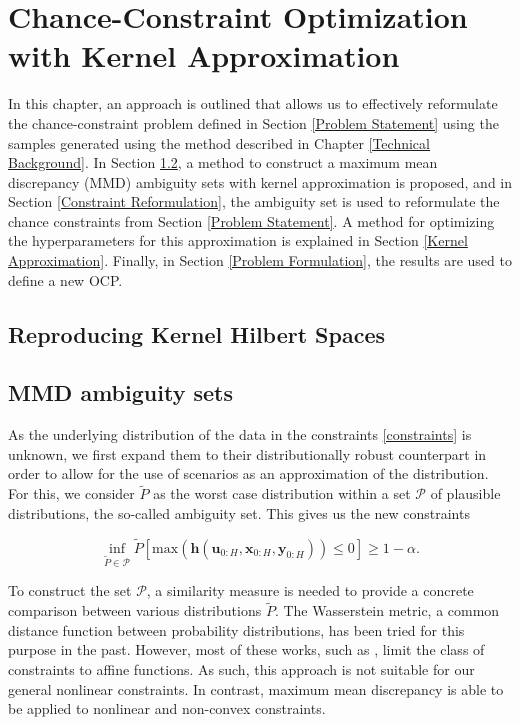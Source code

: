 \chapter{Chance-Constraint Optimization with Kernel Approximation} \label{Technical Approach}

In this chapter, an approach is outlined that allows us to effectively reformulate the chance-constraint problem defined in Section \ref{Problem Statement} using the samples generated using the method described in Chapter \ref{Technical Background}. In Section \ref{SubSec:MMD}, a method to construct a maximum mean discrepancy (MMD) ambiguity sets with kernel approximation is proposed, and in Section \ref{Constraint Reformulation}, the ambiguity set is used to reformulate the chance constraints from Section \ref{Problem Statement}. A method for optimizing the hyperparameters for this approximation is explained in Section \ref{Kernel Approximation}. Finally, in Section \ref{Problem Formulation}, the results are used to define a new OCP.

\section{Reproducing Kernel Hilbert Spaces} \label{SubSec:RKHS}


\section{MMD ambiguity sets} \label{SubSec:MMD}

As the underlying distribution of the data in the constraints \eqref{constraints} is unknown, we first expand them to their distributionally robust counterpart in order to allow for the use of scenarios as an approximation of the distribution. For this, we consider $\tilde{P}$ as the worst case distribution within a set $\mathcal{P}$ of plausible distributions, the so-called ambiguity set. This gives us the new constraints

\begin{equation} \label{wc constraints}
\inf\limits_{\tilde{P} \in \mathcal{P}}\tilde{P} \left[ \text{max}(\boldsymbol{h}(\boldsymbol{u}_{0:H},  \boldsymbol{x}_{0:H},  \boldsymbol{y}_{0:H})) \leq 0 \right] \geq 1 - \alpha.
\end{equation}

To construct the set $\mathcal{P}$, a similarity measure is needed to provide a concrete comparison between various distributions $\tilde{P}$. The Wasserstein metric, a common distance function between probability distributions, has been tried for this purpose in the past. However, most of these works, such as \cite{Hota_19}, limit the class of constraints to affine functions. As such, this approach is not suitable for our general nonlinear constraints. In contrast, maximum mean discrepancy \cite{Arthur_12} is able to be applied to nonlinear and non-convex constraints.

